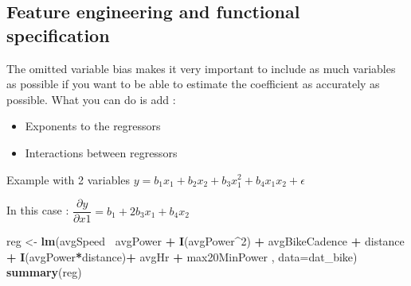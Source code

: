 \documentclass[
]{book}
\newenvironment{Shaded}{\begin{snugshade}}{\end{snugshade}}
\newcommand{\DataTypeTok}[1]{\textcolor[rgb]{0.13,0.29,0.53}{#1}}
\newcommand{\DecValTok}[1]{\textcolor[rgb]{0.00,0.00,0.81}{#1}}
\newcommand{\KeywordTok}[1]{\textcolor[rgb]{0.13,0.29,0.53}{\textbf{#1}}}
\newcommand{\NormalTok}[1]{#1}
\newcommand{\OperatorTok}[1]{\textcolor[rgb]{0.81,0.36,0.00}{\textbf{#1}}}
\newcommand{\StringTok}[1]{\textcolor[rgb]{0.31,0.60,0.02}{#1}}
\providecommand{\tightlist}{%
  \setlength{\itemsep}{0pt}\setlength{\parskip}{0pt}}
\begin{document}
\hypertarget{feature-engineering-and-functional-specification}{%
\subsection{Feature engineering and functional specification}\label{feature-engineering-and-functional-specification}}

The omitted variable bias makes it very important to include as much variables as possible if you want to be able to estimate the coefficient as accurately as possible. What you can do is add :

\begin{itemize}
\tightlist
\item
  Exponents to the regressors
\item
  Interactions between regressors
\end{itemize}

Example with 2 variables \(y=b_1x_1 + b_2x_2 + b_3x_1^2 + b_4x_1x_2 + \epsilon\)

In this case : \(\dfrac{\partial y}{\partial x1} = b_1+2b_3x_1+b_4x_2\)

\begin{Shaded}
\begin{Highlighting}[]
\NormalTok{reg <-}\StringTok{ }\KeywordTok{lm}\NormalTok{(avgSpeed}\OperatorTok{~}\StringTok{ }\NormalTok{avgPower }\OperatorTok{+}\StringTok{ }\KeywordTok{I}\NormalTok{(avgPower}\OperatorTok{^}\DecValTok{2}\NormalTok{) }\OperatorTok{+}\StringTok{ }\NormalTok{avgBikeCadence }\OperatorTok{+}\StringTok{ }
\StringTok{             }\NormalTok{distance }\OperatorTok{+}\StringTok{ }\KeywordTok{I}\NormalTok{(avgPower}\OperatorTok{*}\NormalTok{distance)}\OperatorTok{+}\StringTok{  }\NormalTok{avgHr }\OperatorTok{+}\StringTok{ }\NormalTok{max20MinPower , }\DataTypeTok{data=}\NormalTok{dat_bike)}
\KeywordTok{summary}\NormalTok{(reg)}
\end{Highlighting}
\end{Shaded}
\end{document}
